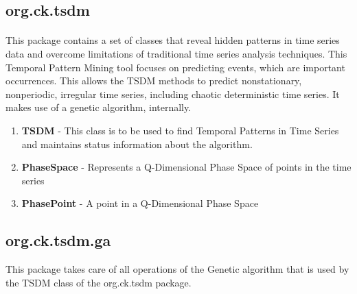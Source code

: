 \documentclass[12pt,a4paper]{report}
\begin{document}
\subsection{org.ck.tsdm}

\paragraph{} This package contains a set of classes that reveal hidden
patterns in time series data and overcome limitations of traditional time series analysis
techniques. This Temporal Pattern Mining tool focuses on predicting events, which are important
occurrences. This allows the TSDM methods to predict nonstationary, nonperiodic,
irregular time series, including chaotic deterministic time series. It makes use of a genetic algorithm, internally.

\begin{enumerate}

\item{\textbf{TSDM} - This class is to be used to find Temporal Patterns in Time Series and maintains status information about the algorithm.}

\item{\textbf{PhaseSpace} - Represents a Q-Dimensional Phase Space of points in the time series}

\item{\textbf{PhasePoint} - A point in a Q-Dimensional Phase Space}

\end{enumerate}

\subsection{org.ck.tsdm.ga}
This package takes care of all operations of the Genetic algorithm that is used by the TSDM class of the org.ck.tsdm package.
\end{document}
